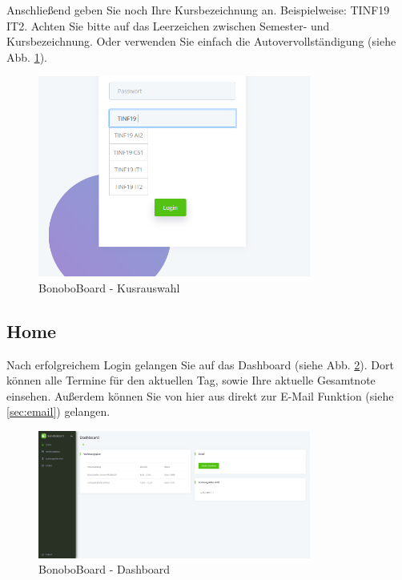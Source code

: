 \documentclass[a4paper,11pt]{scrartcl}
\begin{document}
\bigskip
Anschließend geben Sie noch Ihre Kursbezeichnung an. Beispielweise: \frqq{}TINF19 IT2\flqq{}. Achten Sie bitte auf das Leerzeichen zwischen Semester- und Kursbezeichnung. Oder verwenden Sie einfach die Autovervollständigung (siehe Abb. \ref{img:autocomplete}).
\begin{figure}[H]
	\begin{center}
		\includegraphics[width=0.8\textwidth]{autocomplete}
		\caption{BonoboBoard - Kusrauswahl}
		\label{img:autocomplete}
	\end{center}
\end{figure}
\noindent

\subsection{Home}
Nach erfolgreichem Login gelangen Sie auf das Dashboard (siehe Abb. \ref{img:dashboard}). Dort können alle Termine für den aktuellen Tag, sowie Ihre aktuelle Gesamtnote einsehen. Außerdem können Sie von hier aus direkt zur E-Mail Funktion (siehe \ref{sec:email}) gelangen.

\begin{figure}[H]
	\begin{center}
		\includegraphics[width=0.8\textwidth]{Dashboard}
		\caption{BonoboBoard - Dashboard}
		\label{img:dashboard}
	\end{center}
\end{figure}
\noindent
\end{document}
